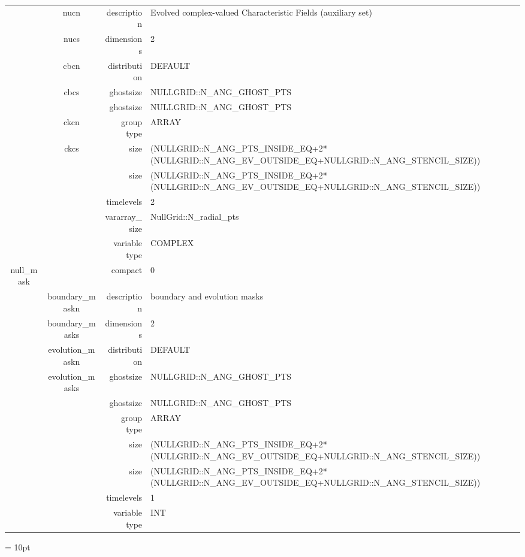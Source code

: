 \begin{tabular*}{150mm}{|c|c@{\extracolsep{\fill}}|rl|}
 & nucn & description & Evolved complex-valued Characteristic Fields (auxiliary set) \\ 
 & nucs & dimensions & 2 \\ 
 & cbcn & distribution & DEFAULT \\ 
 & cbcs & ghostsize & NULLGRID::N\_ANG\_GHOST\_PTS \\ 
& ~ & ghostsize & NULLGRID::N\_ANG\_GHOST\_PTS \\ 
 & ckcn & group type & ARRAY \\ 
 & ckcs & size & (NULLGRID::N\_ANG\_PTS\_INSIDE\_EQ+2*(NULLGRID::N\_ANG\_EV\_OUTSIDE\_EQ+NULLGRID::N\_ANG\_STENCIL\_SIZE)) \\ 
& ~ & size & (NULLGRID::N\_ANG\_PTS\_INSIDE\_EQ+2*(NULLGRID::N\_ANG\_EV\_OUTSIDE\_EQ+NULLGRID::N\_ANG\_STENCIL\_SIZE)) \\ 
 &  & timelevels & 2 \\ 
 &  & vararray\_size & NullGrid::N\_radial\_pts \\ 
 &  & variable type & COMPLEX \\ 
\hline 
null\_mask &  & compact & 0 \\ 
 & boundary\_maskn & description & boundary and evolution masks \\ 
 & boundary\_masks & dimensions & 2 \\ 
 & evolution\_maskn & distribution & DEFAULT \\ 
 & evolution\_masks & ghostsize & NULLGRID::N\_ANG\_GHOST\_PTS \\ 
& ~ & ghostsize & NULLGRID::N\_ANG\_GHOST\_PTS \\ 
 &  & group type & ARRAY \\ 
 &  & size & (NULLGRID::N\_ANG\_PTS\_INSIDE\_EQ+2*(NULLGRID::N\_ANG\_EV\_OUTSIDE\_EQ+NULLGRID::N\_ANG\_STENCIL\_SIZE)) \\ 
& ~ & size & (NULLGRID::N\_ANG\_PTS\_INSIDE\_EQ+2*(NULLGRID::N\_ANG\_EV\_OUTSIDE\_EQ+NULLGRID::N\_ANG\_STENCIL\_SIZE)) \\ 
 &  & timelevels & 1 \\ 
 &  & variable type & INT \\ 
\hline 
\end{tabular*} 



\vspace{5mm}\parskip = 10pt 
